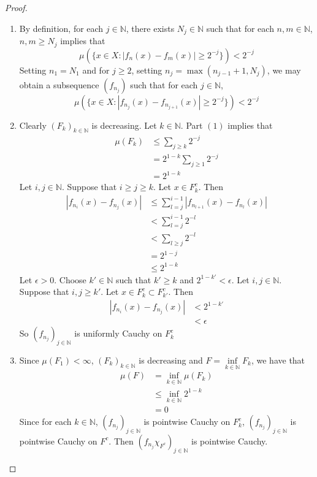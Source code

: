 \documentclass[12pt]{amsart}
\theoremstyle{definition}
\newcommand{\ep}{\epsilon}
\newcommand{\N}{\mathbb{N}}
\begin{document}
	\begin{proof}\
	\begin{enumerate}
	\item By definition, for each $j \in \N$, there exists $N_j \in \N$ such that for each $n,m \in \N$, $n,m \geq N_j$ implies that 
	$$\mu(\{x \in X: |f_n(x) - f_m(x)| \geq 2^{-j} \}) < 2^{-j}$$ 
	Setting $n_1 = N_1$ and for $j \geq 2$, setting $n_j = \max (n_{j-1}+1, N_j)$, we may obtain a subsequence $(f_{n_j})$ such that for each $j \in \N$, 
	$$\mu(\{x \in X: |f_{n_j}(x) - f_{n_{j+1}}(x)| \geq 2^{-j}\}) < 2^{-j}$$
	\item Clearly $(F_k)_{k \in \N}$ is decreasing. Let $k \in \N$. Part $(1)$ implies that 
	\begin{align*}
	\mu(F_k) 
	&\leq \sum_{j \geq k}2^{-j} \\
	&= 2^{1-k}\sum_{j \geq 1}2^{-j}  \\
	&= 2^{1-k}
	\end{align*}
	Let $i, j \in \N$. Suppose that $i \geq j \geq k$. Let $x \in F_k^c$. Then 
	\begin{align*}
	|f_{n_i}(x) - f_{n_j}(x)| 
	& \leq \sum_{l = j}^{i-1} |f_{n_{l+1}}(x) - f_{n_l}(x)| \\
	& < \sum_{l = j}^{i-1} 2^{-l} \\
	& <  \sum_{l \geq j} 2^{-l} \\
	&= 2^{1 - j} \\
	& \leq 2^{1 - k}	 
	\end{align*}
	Let $\ep >0$. Choose $k' \in \N$ such that $k' \geq k$ and $2^{1-k'} < \ep$. Let $i,j \in \N$. Suppose that $i,j \geq k'$. Let $x \in F_k^c \subset F_{k'}^c$. Then 
	\begin{align*}
	|f_{n_i}(x) - f_{n_j}(x)| 
	&< 2^{1-k'} \\
	&< \ep 
	\end{align*}
	So $(f_{n_j})_{j \in \N}$ is uniformly Cauchy on $F_k^c$
	\item Since $\mu(F_1) < \infty $, $(F_k)_{k \in \N}$ is decreasing and $F = \inf\limits_{k \in \N}F_k$, we have that
	\begin{align*}
	\mu(F) 
	&= \inf_{k \in \N} \mu(F_k) \\
	&\leq \inf_{k \in \N} 2^{1-k} \\
	&= 0
	\end{align*}
	Since for each $k \in \N$, $(f_{n_j})_{j \in \N}$ is pointwise Cauchy on $F^c_k$, $(f_{n_j})_{j \in \N}$ is pointwise Cauchy on $F^c$. Then $(f_{n_j}\chi_{F^c})_{j \in \N}$ is pointwise Cauchy. \\

\end{enumerate}
\end{proof}
\end{document}
